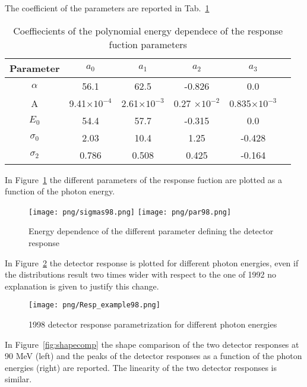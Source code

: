 The  coefficient of the parameters are reported in Tab.~\ref{tab:param98}
\begin{table}[!h]
\begin{center}
\begin{tabular}{| c | c | c | c | c | c | }
\hline
Parameter & $a_0$ & $a_1$ & $a_2$ & $a_3$ \\ \hline
$\alpha$ & 56.1 &62.5 & -0.826 & 0.0  \\ \hline
A & 9.41$\times 10^{-4}$ & 2.61$\times 10^{-3}$ &0.27 $\times 10^{-2}$ &0.835$\times 10^{-3}$   \\ \hline
$E_0$ & 54.4 & 57.7 & -0.315 &0.0 \\ \hline
$\sigma_0$ & 2.03 &10.4 &1.25 & -0.428\\ \hline
$\sigma_2$ & 0.786 & 0.508 & 0.425 & -0.164\\ \hline

\end{tabular}
\end{center}
\caption{Coeffiecients of the polynomial energy dependece of the response fuction parameters\label{tab:param98}}
\end{table}

In Figure~\ref{fig:parameters98} the different parameters of the response fuction are plotted as a function of the photon energy.


\begin{figure}[!h]
 \begin{center}
 \texttt{[image: png/sigmas98.png]} 
 \texttt{[image: png/par98.png]} 
 \end{center}
 \caption{Energy dependence of the different parameter defining the detector response}
 \label{fig:parameters98}
 \end{figure}

In  Figure~\ref{fig:response98} the detector response is plotted for different photon energies, even if the distributions result two times wider with respect to the one of 1992 no explanation is given to justify this change.  %

\begin{figure}[!h]
\centering
\texttt{[image: png/Resp\_example98.png]}
\caption{1998 detector response parametrization for different photon energies}
\label{fig:response98}
\end{figure}

In Figure~\ref{fig:shapecomp} the shape comparison of the two detector responses at 90 MeV (left) and the peaks of the detector responses as a function of the photon energies (right) are reported. The linearity of the two detector responses is similar.

